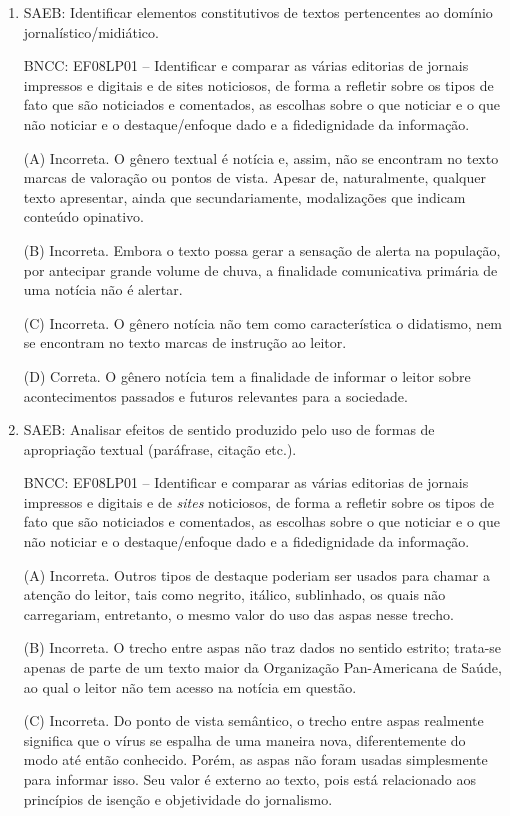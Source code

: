 \begin{enumerate}
\item
SAEB: Identificar elementos constitutivos de textos pertencentes ao
domínio jornalístico/midiático. 

BNCC: EF08LP01 -- Identificar e comparar
as várias editorias de jornais impressos e digitais e de sites
noticiosos, de forma a refletir sobre os tipos de fato que são
noticiados e comentados, as escolhas sobre o que noticiar e o que não
noticiar e o destaque/enfoque dado e a fidedignidade da informação.

(A) Incorreta. O gênero textual é notícia e, assim, não se encontram no
texto marcas de valoração ou pontos de vista. Apesar de, naturalmente, qualquer texto apresentar, ainda que secundariamente, modalizações que indicam conteúdo opinativo.

(B) Incorreta. Embora o
texto possa gerar a sensação de alerta na população, por antecipar
grande volume de chuva, a finalidade comunicativa primária de uma
notícia não é alertar. 

(C) Incorreta. O gênero notícia não tem como
característica o didatismo, nem se encontram no texto marcas de
instrução ao leitor. 

(D) Correta. O gênero notícia tem a finalidade de
informar o leitor sobre acontecimentos passados e futuros relevantes
para a sociedade.

\item
SAEB: Analisar efeitos de sentido produzido pelo uso de formas de
apropriação textual (paráfrase, citação etc.). 

BNCC: EF08LP01 --
Identificar e comparar as várias editorias de jornais impressos e
digitais e de \emph{sites} noticiosos, de forma a refletir sobre os
tipos de fato que são noticiados e comentados, as escolhas sobre o que
noticiar e o que não noticiar e o destaque/enfoque dado e a
fidedignidade da informação.

(A) Incorreta. Outros tipos de destaque poderiam ser usados para chamar
a atenção do leitor, tais como negrito, itálico, sublinhado, os quais
não carregariam, entretanto, o mesmo valor do uso das aspas nesse trecho.

(B) Incorreta. O trecho entre aspas não traz dados no sentido estrito;
trata-se apenas de parte de um texto maior da Organização Pan-Americana
de Saúde, ao qual o leitor não tem acesso na notícia em questão. 

(C) Incorreta. Do ponto de vista semântico, o trecho entre aspas realmente
significa que o vírus se espalha de uma maneira nova, diferentemente do
modo até então conhecido. Porém, as aspas não foram usadas simplesmente
para informar isso. Seu valor é externo ao texto, pois está relacionado
aos princípios de isenção e objetividade do jornalismo. 


\end{enumerate}

